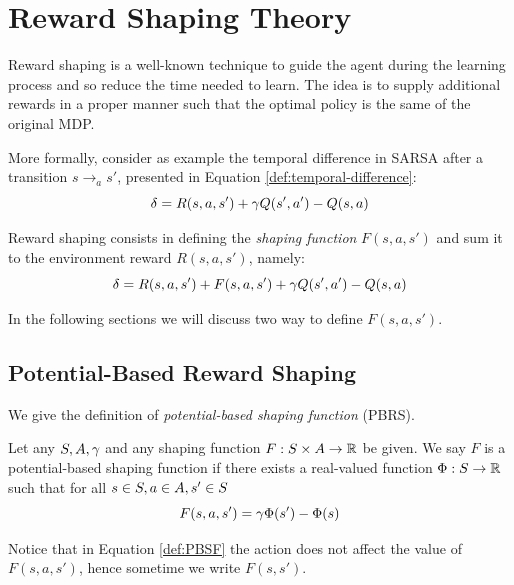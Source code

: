 \section{Reward Shaping Theory}
Reward shaping is a well-known technique to guide the agent during the learning process and so reduce the time needed to learn. The idea is to supply additional rewards in a proper manner such that the optimal policy is the same of the original MDP.

More formally, consider as example the temporal difference in SARSA after a transition $s \to_a s'$, presented in Equation \ref{def:temporal-difference}:
\begin{equation}
\delta = R(s,a,s') + \gamma Q(s', a') - Q(s, a)
\end{equation}

Reward shaping consists in defining the \emph{shaping function} $F(s,a,s')$ and sum it to the environment reward $R(s,a,s')$, namely:
\begin{equation}\label{eq:temporal-difference-reward-shaping}
\delta = R(s,a,s') + F(s,a,s') + \gamma Q(s', a') - Q(s, a)
\end{equation}

In the following sections we will discuss two way to define $F(s,a,s')$. 

\subsection{Potential-Based Reward Shaping}\label{sect:PBRS}
We give the definition of \emph{potential-based shaping function} (PBRS).
\begin{definition}\label{def:PBSF}
	Let any $S, A, \gamma$ and any shaping function $F: S\times A\to\mathbb{R}$ be given.
	We say $F$ is a potential-based shaping function if there exists a real-valued function $\Phi: S \to \mathbb{R}$ such that for all $s\in S, a\in A, s'\in S$
	\begin{equation}\label{eq:PBSF}
	F(s,a,s') = \gamma\Phi(s') - \Phi(s)
	\end{equation}
\end{definition}
Notice that in Equation \ref{def:PBSF} the action does not affect the value of $F(s,a,s')$, hence sometime we write $F(s,s')$.

